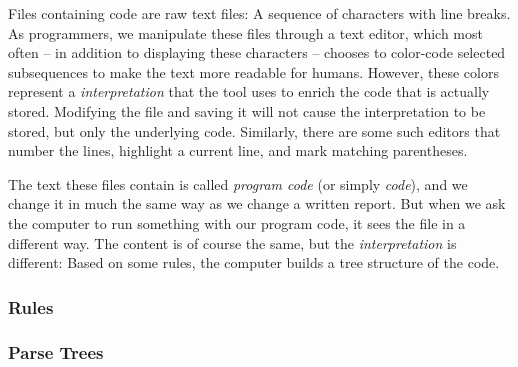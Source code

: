 Files containing code are raw text files: A sequence of characters with line breaks. As programmers, we manipulate these files through a text editor, which most often -- in addition to displaying these characters -- chooses to color-code selected subsequences to make the text more readable for humans. However, these colors represent a \textsl{interpretation} that the tool uses to enrich the code that is actually stored. Modifying the file and saving it will not cause the interpretation to be stored, but only the underlying code. Similarly, there are some such editors that number the lines, highlight a current line, and mark matching parentheses.

The text these files contain is called \textsl{program code} (or simply \textsl{code}), and we change it in much the same way as we change a written report. But when we ask the computer to run something with our program code, it sees the file in a different way. The content is of course the same, but the \textsl{interpretation} is different: Based on some rules, the computer builds a tree structure of the code.


\subsubsection{Rules}


\subsubsection{Parse Trees}

